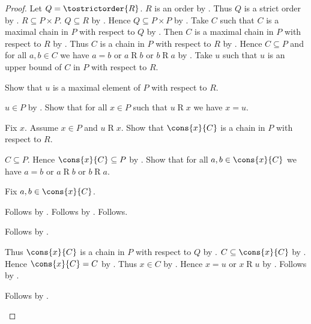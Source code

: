 \begin{proof}
    Let $Q=\tostrictorder{R}$.
    $R$ is an order by .
    Thus $Q$ is a strict order by .
    $R\subseteq P\times P$.
    $Q\subseteq R$ by .
    Hence $Q\subseteq P\times P$ by .
    Take $C$ such that $C$ is a maximal chain in $P$ with respect to $Q$
        by .
    Then $C$ is a maximal chain in $P$ with respect to $R$
        by .
    Thus $C$ is a chain in $P$ with respect to $R$
        by .
    Hence $C\subseteq P$ and for all $a,b\in C$ we have
        $a=b$ or $a\mathrel{R}b$ or $b\mathrel{R}a$
        by .
    Take $u$ such that $u$ is an upper bound of $C$ in $P$
        with respect to $R$.

    Show that $u$ is a maximal element of $P$ with respect to $R$.
    \begin{subproof}
        $u\in P$ by .
        Show that for all $x\in P$ such that $u\mathrel{R}x$ we have $x=u$.
        \begin{subproof}
            Fix $x$.
            Assume $x\in P$ and $u\mathrel{R}x$.
            Show that $\cons{x}{C}$ is a chain in $P$ with respect to $R$.
            \begin{subproof}
                $C\subseteq P$.
                Hence $\cons{x}{C}\subseteq P$ by .
                Show that for all $a,b\in\cons{x}{C}$ we have
                    $a=b$ or $a\mathrel{R}b$ or $b\mathrel{R}a$.
                \begin{subproof}
                    Fix $a,b\in\cons{x}{C}$.
                    \begin{byCase}
                        Follows by
                            .
                        Follows by
                            .
                        Follows.
                    \end{byCase}
                \end{subproof}
                Follows by .
            \end{subproof}
            Thus $\cons{x}{C}$ is a chain in $P$ with respect to $Q$
                by .
            $C\subseteq\cons{x}{C}$ by .
            Hence $\cons{x}{C}=C$ by
                .
            Thus $x\in C$ by .
            Hence $x=u$ or $x\mathrel{R}u$ by .
            Follows by .
        \end{subproof}
        Follows by .
    \end{subproof}
\end{proof}

